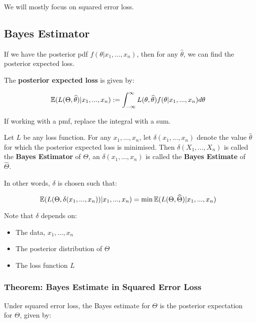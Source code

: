 \documentclass[a4paper]{article}
\begin{document}
                We will mostly focus on squared error loss.

        \subsection{Bayes Estimator}
            If we have the posterior pdf $f(\theta | x_1, ..., x_n)$, then for
            any $\widehat \theta$, we can find the posterior expected loss.

            \begin{definition}
                The \textbf{posterior expected loss} is given by:

                \[
                    \mathbb{E}(L(\Theta, \widehat \theta) | x_1, ..., x_n) :=
                    \int_{-\infty}^\infty L(\theta, \widehat \theta) f(\theta |
                    x_1, ..., x_n) d\theta
                \]

                If working with a pmf, replace the integral with a sum.

                Let $L$ be any loss function. For any $x_1, ..., x_n$, let
                $\delta(x_1, ..., x_n)$ denote the value $\widehat \theta$ for
                which the posterior expected loss is minimised. Then
                $\delta(X_1, ..., X_n)$ is called the \textbf{Bayes Estimator}
                of $\Theta$, an $\delta(x_1, ..., x_n)$ is called the
                \textbf{Bayes Estimate} of $\widehat \Theta$.
            \end{definition}

            In other words, $\delta$ is chosen such that:

            \[
                \mathbb{E}(L(\Theta, \delta(x_1, ..., x_n)) | x_1, ..., x_n) =
                \min \mathbb{E}(L(\Theta, \widehat\Theta) | x_1, ..., x_n)
            \]

            Note that $\delta$ depends on:

            \begin{itemize}
                \item The data, $x_1, ..., x_n$
                \item The posterior distribution of $\Theta$
                \item The loss function $L$
            \end{itemize}

            \subsubsection{Theorem: Bayes Estimate in Squared Error Loss}
                Under squared error loss, the Bayes estimate for $\Theta$ is the
                posterior expectation for $\Theta$, given by:
\end{document}
